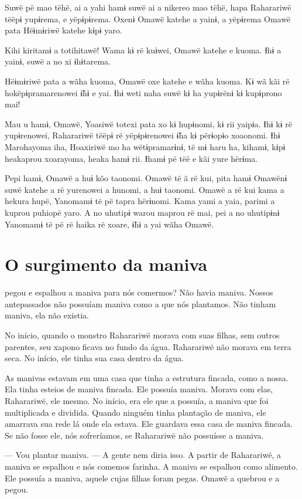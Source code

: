 Suwë pë mao tëhë, ai a yahi hamɨ suwë ai a nikereo mao tëhë, hapa
Raharariwë tëëpɨ yupɨrema, e yëpɨpɨrema. Oxenɨ Omawë katehe a yainɨ, a
yëpɨrema Omawë pata Hëɨmɨriwë katehe kɨpɨ yaro. 

Kihi kiritamɨ a totihitawë! Wama kɨ rë kuɨwei, Omawë katehe e kuoma. Ɨhɨ
a yainɨ, suwë a no xi ɨhɨtarema. 

Hëɨmɨriwë pata a wãha kuoma, Omawë oxe katehe e wãha kuoma. Kɨ wã kãi rë
hokëpɨpramarenowei ɨ̃hɨ e yai. Ɨhɨ weti naha suwë kɨ ha yupɨrënɨ kɨ
kupɨprono mai! 

Mau u hamɨ, Omawë, Yoasiwë totexi pata xo kɨ hupɨnomi, kɨ rii yaipɨa.
Ɨhɨ kɨ rë yupɨrenowei, Raharariwë tëëpɨ rë yëpɨpɨrenowei ɨ̃ha kɨ përɨopɨo
xoaonomi. Ɨhɨ Marohayoma iha, Hoaxiriwë mo ha wëtɨpramarɨnɨ, të mɨ haru
ha, kihamɨ, kɨpɨ heakaprou xoarayoma, heaka hamɨ rii. Ɨhamɨ pë tëë e kãi
yure hërɨma. 

Pepi hamɨ, Omawë a huɨ kõo taonomi. Omawë të ã rë kui, pita hamɨ Omawënɨ
suwë katehe a rë yurenowei a hunomi, a huɨ taonomi. Omawë a rë kui kama
a hekura hupë, Yanomamɨ të pë tapra hërɨnomi. Kama yami a yaia, parimi a
kuprou puhiopë yaro. A no uhutipɨ warou maprou rë mai, pei a no
uhutipɨnɨ Yanomamɨ të pë rë haika rë xoare, ɨ̃hɨ a yai wãha Omawë. 

\chapter{O surgimento da maniva}
 
 pegou e espalhou a maniva para nós comermos? Não havia maniva.
Nossos antepassados não possuíam maniva como a que nós plantamos. Não
tinham maniva, ela não existia. 

No início, quando o monstro Raharariwë morava com suas filhas, sem outros
parentes, seu xapono ficava no fundo da água. Raharariwë não morava em
terra seca. No início, ele tinha sua casa dentro da água. 

As manivas estavam em uma casa que tinha a estrutura fincada, como a
nossa. Ela tinha esteios de maniva fincada. Ele possuía maniva. Morava
com elas, Raharariwë, ele mesmo. No início, era ele que a possuía, a
maniva que foi multiplicada e dividida. Quando ninguém tinha plantação
de maniva, ele amarrava sua rede lá onde ela estava. Ele guardava essa casa
de maniva fincada. Se não fosse ele, nós sofreríamos, se Raharariwë não
possuísse a maniva. 

--- Vou plantar maniva. --- A gente nem diria isso. A partir de
Raharariwë, a maniva se espalhou e nós comemos farinha. A maniva se
espalhou como alimento. Ele possuía a maniva, aquele cujas filhas foram
pegas. Omawë a quebrou e a pegou.

